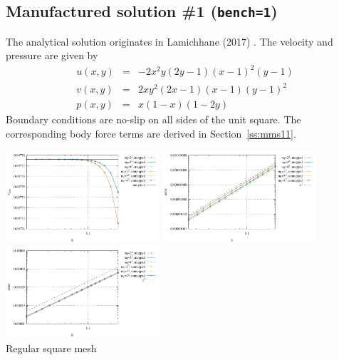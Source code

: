 \subsection*{Manufactured solution \#1 ({\tt bench=1})}

The analytical solution originates in Lamichhane (2017) \cite{lami17}.
The velocity and pressure are given by
\begin{eqnarray}
u(x,y)&=&-2x^2y(2y-1)(x-1)^2(y-1) \\
v(x,y)&=& 2xy^2(2x-1)(x-1)(y-1)^2 \\
p(x,y)&=& x(1-x)(1-2y)
\end{eqnarray}
Boundary conditions are no-slip on all sides of the unit square. 
The corresponding body force terms are derived in Section~\ref{ss:mms11}. 

\begin{center}
\includegraphics[width=5.7cm]{python_codes/fieldstone_76/results/mms1/reg/vrms}
\includegraphics[width=5.7cm]{python_codes/fieldstone_76/results/mms1/reg/errors_V}
\includegraphics[width=5.7cm]{python_codes/fieldstone_76/results/mms1/reg/errors_P}\\
{\captionfont Regular square mesh}
\end{center}

